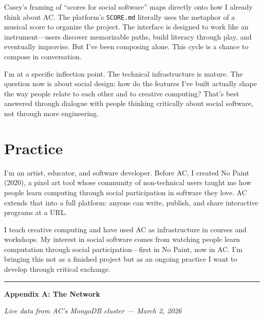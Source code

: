 \documentclass[10pt,letterpaper,twocolumn]{article}
\begin{document}
Casey's framing of ``scores for social software'' maps directly onto how I already think about AC. The platform's \texttt{SCORE.md} literally uses the metaphor of a musical score to organize the project. The interface is designed to work like an instrument---users discover memorizable paths, build literacy through play, and eventually improvise. But I've been composing alone. This cycle is a chance to compose in conversation.

I'm at a specific inflection point. The technical infrastructure is mature. The question now is about social design: how do the features I've built actually shape the way people relate to each other and to creative computing? That's best answered through dialogue with people thinking critically about social software, not through more engineering.

\section*{Practice}

I'm an artist, educator, and software developer. Before AC, I created No Paint (2020), a pixel art tool whose community of non-technical users taught me how people learn computing through social participation in software they love. AC extends that into a full platform: anyone can write, publish, and share interactive programs at a URL.

I teach creative computing and have used AC as infrastructure in courses and workshops. My interest in social software comes from watching people learn computation through social participation---first in No Paint, now in AC. I'm bringing this not as a finished project but as an ongoing practice I want to develop through critical exchange.


\onecolumn
\vspace{0.5em}
\rule{\textwidth}{2pt}
\vspace{0.3em}

\begin{center}
{\large\bfseries Appendix A: The Network}\par
\vspace{0.2em}
{\small\itshape Live data from AC's MongoDB cluster --- March 2, 2026}
\end{center}

\vspace{0.5em}
\end{document}
